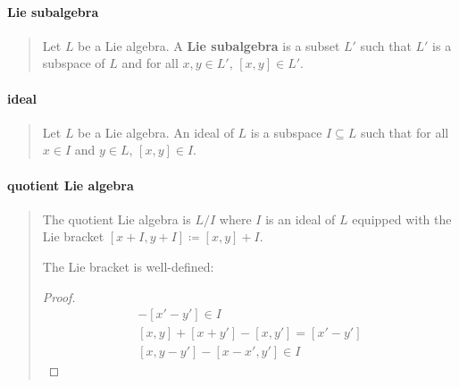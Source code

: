 \documentclass[letterpaper, 10pt]{article}
\theoremstyle{theostyle}
\begin{document}
\paragraph{Lie subalgebra}
\begin{quote}
    Let \(L\) be a Lie algebra.
    A \textbf{Lie subalgebra} is a subset \(L'\) such that \(L'\) is a subspace of \(L\) and for all \(x, y \in L'\), \([x, y] \in L'\).
\end{quote}

\paragraph{ideal}
\begin{quote}
    Let \(L\) be a Lie algebra.
    An ideal of \(L\) is a subspace \(I \subseteq L\) such that for all \(x \in I\) and \(y \in L\), \([x,y] \in I\).
\end{quote}

\paragraph{quotient Lie algebra}
\begin{quote}
    The quotient Lie algebra is \(L/I\) where \(I\) is an ideal of \(L\) equipped with the Lie bracket \([x + I, y + I] \coloneqq [x,y] + I\).

    The Lie bracket is well-defined:
    \begin{proof}
        \begin{align*}
            [x, y] - [x' - y'] \in I \\
            [x , y] + [x + y'] - [x, y'] = [x' - y'] \\
            [x, y-y'] - [x - x', y'] \in I
        \end{align*}
    \end{proof}
\end{quote}
\end{document}
